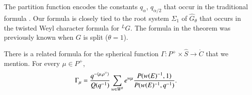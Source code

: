 The partition function
encodes the constants $q_\alpha$, $q_{\alpha/2}$ that occur in the traditional formula \cite{macdonaldspherical}.  
Our formula is closely
tied to the root system $\Sigma_1$ of $\hat G_\theta$
that occurs in the twisted Weyl character formula for ${}^LG$.  
The formula in the theorem was previously known when $G$ is split  ($\theta=1$).

There is a related formula for the spherical function $\Gamma:P^+\times\hat S\to\ring{C}$ that we mention.
For every $\mu\in P^+$, 
\begin{equation} 
\Gamma_\mu = 
\frac{q^{-\langle{\mu,\rho^\vee}\rangle}}{ Q(q^{-1})} \sum_{w\in W^\theta} e^{w\mu} \frac{P(w(E)^{-1},1)}{P(w(E)^{-1},q^{-1})}.
\end{equation}


